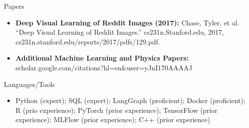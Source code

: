 \documentclass[]{mcdowellcv}
\begin{document}
	\begin{cvsection}{Papers}
		\begin{cvsubsection}{}{}{}	
			\begin{itemize}
				\item \textbf{Deep Visual Learning of Reddit Images (2017):} Chase, Tyler, et al. “Deep Visual Learning of Reddit Images.” cs231n.Stanford.edu, 2017, cs231n.stanford.edu/reports/2017/pdfs/129.pdf.			
				\item \textbf{Additional Machine Learning and Physics Papers:} scholar.google.com/citations?hl=en\&user=yJnI170AAAAJ
			\end{itemize}
		\end{cvsubsection}
	\end{cvsection}
	
	\begin{cvsection}{Languages/Tools}
		\begin{cvsubsection}{}{}{}	
			\begin{itemize}
				\item Python (expert); SQL (expert); LangGraph (proficient); Docker (proficient); R (prio experience); PyTorch (prior experience); TensorFlow (prior experience); MLFlow (prior experience); C++ (prior experience)
			\end{itemize}
		\end{cvsubsection}
	\end{cvsection}
	
\end{document}
